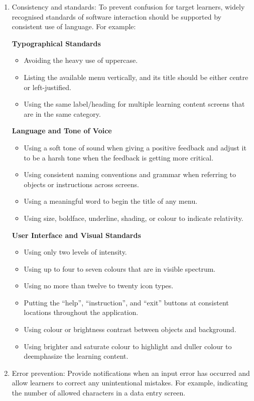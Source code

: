 \begin{enumerate}
\item Consistency and standards: To prevent confusion for target learners, widely recognised standards of software interaction should be supported by consistent use of language.  For example:

\textbf{Typographical Standards}
\begin{itemize} 
\item Avoiding the heavy use of uppercase.
\item Listing the available menu vertically, and its title should be either centre or left-justified.
\item Using the same label/heading for multiple learning content screens that are in the same category.
\end{itemize}
\textbf{Language and Tone of Voice} 
\begin{itemize}
\item Using a soft tone of sound when giving a positive feedback and adjust it to be a harsh tone when the feedback is getting more critical.
\item Using consistent naming conventions and grammar when referring to objects or instructions across screens. 
\item Using a meaningful word to begin the title of any menu. 
\item Using size, boldface, underline, shading, or colour to indicate relativity.
\end{itemize}
\textbf{User Interface and Visual Standards}
\begin{itemize} 
\item Using only two levels of intensity.
\item Using up to four to seven colours that are in visible spectrum.
\item Using no more than twelve to twenty icon types.
\item Putting the ``help'', ``instruction'', and ``exit'' buttons at consistent locations throughout the application.
\item Using colour or brightness contrast between objects and background.
\item Using brighter and saturate colour to highlight and duller colour to deemphasize the learning content.
\end{itemize} 

\item Error prevention: Provide notifications when an input error has occurred and allow learners to correct any unintentional mistakes. For example, indicating the number of allowed characters in a data entry screen.


\end{enumerate}
